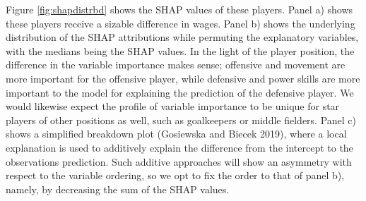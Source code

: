 \documentclass[
]{article}
\begin{document}
Figure \ref{fig:shapdistrbd} shows the SHAP values of these players. Panel a) shows these players receive a sizable difference in wages. Panel b) shows the underlying distribution of the SHAP attributions while permuting the explanatory variables, with the medians being the SHAP values. In the light of the player position, the difference in the variable importance makes sense; offensive and movement are more important for the offensive player, while defensive and power skills are more important to the model for explaining the prediction of the defensive player. We would likewise expect the profile of variable importance to be unique for star players of other positions as well, such as goalkeepers or middle fielders. Panel c) shows a simplified breakdown plot (Gosiewska and Biecek 2019), where a local explanation is used to additively explain the difference from the intercept to the observations prediction. Such additive approaches will show an asymmetry with respect to the variable ordering, so we opt to fix the order to that of panel b), namely, by decreasing the sum of the SHAP values.
\end{document}
